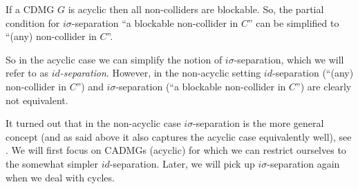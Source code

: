 


\begin{claimmark}
\begin{Rem}
    If a CDMG $G$ is acyclic then all non-colliders are blockable.
    So, the partial condition for $i\sigma$-separation
    ``a blockable non-collider in $C$''
    can be simplified to ``(any) non-collider in $C$''.
    
    So in the acyclic case we can simplify the notion of $i\sigma$-separation, 
    which we will refer to as \emph{$id$-separation}.
    However, in the non-acyclic setting $id$-separation (``(any) non-collider in $C$'') and $i\sigma$-separation (``a blockable non-collider in $C$'') are clearly not equivalent.

    It turned out that in the non-acyclic case $i\sigma$-separation is the more general concept (and as said above it also captures the acyclic case equivalently well), see \cite{FM17,FM18,FM20,BFPM21}.
    We will first focus on CADMGs (acyclic) for which we can restrict ourselves to the somewhat simpler $id$-separation.
    Later, we will pick up $i\sigma$-separation again when we deal with cycles.
\end{Rem}
\end{claimmark}

